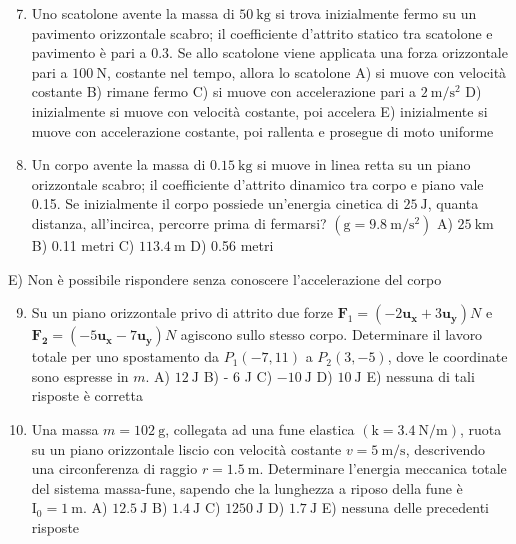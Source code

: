 \documentclass[10pt]{article}
\begin{document}
\begin{enumerate}
  \setcounter{enumi}{6}
  \item Uno scatolone avente la massa di \(50 \mathrm{~kg}\) si trova inizialmente fermo su un pavimento orizzontale scabro; il coefficiente d'attrito statico tra scatolone e pavimento è pari a 0.3. Se allo scatolone viene applicata una forza orizzontale pari a \(100 \mathrm{~N}\), costante nel tempo, allora lo scatolone
A) si muove con velocità costante
B) rimane fermo
C) si muove con accelerazione pari a \(2 \mathrm{~m} / \mathrm{s}^{2}\)
D) inizialmente si muove con velocità costante, poi accelera
E) inizialmente si muove con accelerazione costante, poi rallenta e prosegue di moto uniforme

  \item Un corpo avente la massa di \(0.15 \mathrm{~kg}\) si muove in linea retta su un piano orizzontale scabro; il coefficiente d'attrito dinamico tra corpo e piano vale 0.15. Se inizialmente il corpo possiede un'energia cinetica di \(25 \mathrm{~J}\), quanta distanza, all'incirca, percorre prima di fermarsi? \(\left(\mathrm{g}=9.8 \mathrm{~m} / \mathrm{s}^{2}\right)\)
A) \(25 \mathrm{~km}\)
B) 0.11 metri
C) \(113.4 \mathrm{~m}\)
D) 0.56 metri

\end{enumerate}

E) Non è possibile rispondere senza conoscere l'accelerazione del corpo

\begin{enumerate}
  \setcounter{enumi}{8}
  \item Su un piano orizzontale privo di attrito due forze \(\mathbf{F}_{1}=\left(-2 \mathbf{u}_{\mathbf{x}}+3 \mathbf{u}_{\mathbf{y}}\right) N\) e \(\mathbf{F}_{\mathbf{2}}=\left(-5 \mathbf{u}_{\mathbf{x}}-7 \mathbf{u}_{\mathbf{y}}\right) N\) agiscono sullo stesso corpo. Determinare il lavoro totale per uno spostamento da \(P_{1}(-7,11)\) a \(P_{2}(3,-5)\), dove le coordinate sono espresse in \(m\).
A) \(12 \mathrm{~J}\)
B) - 6 J
C) \(-10 \mathrm{~J}\)
D) \(10 \mathrm{~J}\)
E) nessuna di tali risposte è corretta

  \item Una massa \(m=102 \mathrm{~g}\), collegata ad una fune elastica \((\mathrm{k}=3.4 \mathrm{~N} / \mathrm{m})\), ruota su un piano orizzontale liscio con velocità costante \(v=5 \mathrm{~m} / \mathrm{s}\), descrivendo una circonferenza di raggio \(r=1.5 \mathrm{~m}\). Determinare l'energia meccanica totale del sistema massa-fune, sapendo che la lunghezza a riposo della fune è \(\mathrm{I}_{0}=1 \mathrm{~m}\).
A) \(12.5 \mathrm{~J}\)
B) \(1.4 \mathrm{~J}\)
C) \(1250 \mathrm{~J}\)
D) \(1.7 \mathrm{~J}\)
E) nessuna delle precedenti risposte

\end{enumerate}
\end{document}
